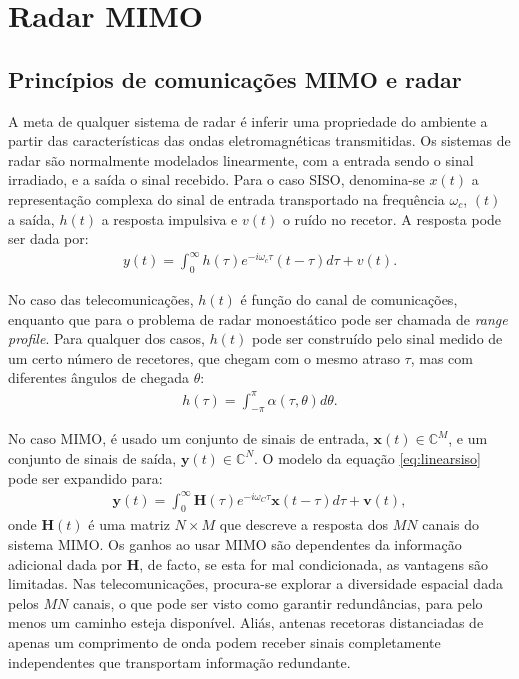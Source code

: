 \documentclass[purist,portuguese]{ist-report}
\begin{document}
\section{Radar MIMO}

\subsection{Princípios de comunicações MIMO e radar}

A meta de qualquer sistema de radar é inferir uma propriedade do ambiente a partir das características das ondas eletromagnéticas transmitidas.
Os sistemas de radar são normalmente modelados linearmente, com a entrada sendo o sinal irradiado, e a saída o sinal recebido. 
Para o caso SISO, denomina-se $x(t)$ a representação complexa do sinal de entrada transportado na frequência $\omega_c$, $(t)$ a saída, $h(t)$ a resposta impulsiva e $v(t)$ o ruído no recetor.
A resposta pode ser dada por:
\begin{align}
  y(t) = \int_0^\infty h(\tau)e^{-i\omega_c\tau}(t-\tau)d\tau + v(t).
  \label{eq:linearsiso}
\end{align}

No caso das telecomunicações, $h(t)$ é função do canal de comunicações, enquanto que para o problema de radar monoestático pode ser chamada de \textit{range profile}.
Para qualquer dos casos, $h(t)$ pode ser construído pelo sinal medido de um certo número de recetores, que chegam com o mesmo atraso $\tau$, mas com diferentes ângulos de chegada $\theta$:
\begin{align}
  h(\tau) = \int_{-\pi}^{\pi}\alpha(\tau,\theta)d\theta.
  \label{eq:profile}
\end{align}

No caso MIMO, é usado um conjunto de sinais de entrada, $\mathbf{x}(t)\in\mathbb{C}^M$, e um conjunto de sinais de saída, $\mathbf{y}(t)\in\mathbb{C}^N$.
O modelo da equação \ref{eq:linearsiso} pode ser expandido para:
\begin{align}
  \mathbf{y}(t) = \int_0^\infty \mathbf{H}(\tau)e^{-i\omega_C \tau}\mathbf{x}(t-\tau)d\tau + \mathbf{v}(t),
  \label{eq:linearmimo}
\end{align}
onde $\mathbf{H}(t)$ é uma matriz $N\times M$ que descreve a resposta dos $MN$ canais do sistema MIMO.
Os ganhos ao usar MIMO são dependentes da informação adicional dada por $\mathbf{H}$, de facto, se esta for mal condicionada, as vantagens são limitadas. 
Nas telecomunicações, procura-se explorar a diversidade espacial dada pelos $MN$ canais, o que pode ser visto como garantir redundâncias, para pelo menos um caminho esteja disponível.
Aliás, antenas recetoras distanciadas de apenas um comprimento de onda podem receber sinais completamente independentes que transportam informação redundante.
\end{document}
